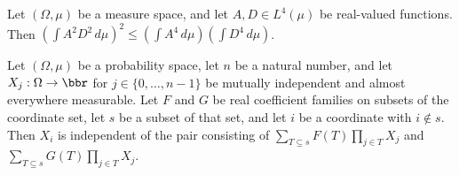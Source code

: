 \begin{theorem}
\leanok
{}
Let $(\Omega,\mu)$ be a measure space, and let $A,D\in L^4(\mu)$ be real-valued
functions. Then $\left(\int A^2D^2\,d\mu\right)^2\leq\left(\int
A^4\,d\mu\right)\left(\int D^4\,d\mu\right)$.
\end{theorem}

\begin{theorem}
\leanok
{}
Let $(\Omega,\mu)$ be a probability space, let $n$ be a natural number, and let
$X_j:\Omega\to\bbr$ for $j\in\{0,\ldots,n-1\}$ be mutually independent and almost
everywhere measurable. Let $F$ and $G$ be real coefficient families on subsets of the
coordinate set, let $s$ be a subset of that set, and let $i$ be a coordinate with
$i\notin s$. Then $X_i$ is independent of the pair consisting of $\sum_{T\subseteq
s}F(T)\prod_{j\in T}X_j$ and $\sum_{T\subseteq s}G(T)\prod_{j\in T}X_j$.
\end{theorem}

